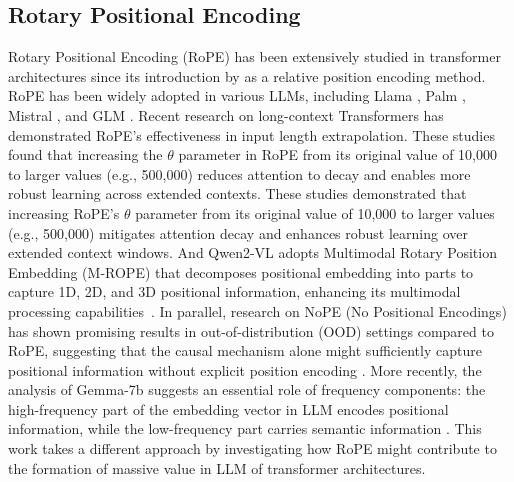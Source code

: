 \subsection{Rotary Positional Encoding}
Rotary Positional Encoding (RoPE) has been extensively studied in transformer architectures since its introduction by \citep{su2021roformer} as a relative position encoding method. RoPE has been widely adopted in various LLMs, including Llama \citep{touvron2023llama}, Palm \citep{anil2023palm}, Mistral \citep{jiang2023mistral}, and GLM \citep{du2022glm}. Recent research on long-context Transformers \citep{sun-etal-2023-length, xiong-etal-2024-effective, dubey2024llama} has demonstrated RoPE's effectiveness in input length extrapolation. These studies found that increasing the $\theta$ parameter in RoPE from its original value of 10,000 to larger values (e.g., 500,000) reduces attention to decay and enables more robust learning across extended contexts. These studies demonstrated that increasing RoPE's $\theta$ parameter from its original value of 10,000 to larger values (e.g., 500,000) mitigates attention decay and enhances robust learning over extended context windows. And Qwen2-VL adopts Multimodal Rotary Position Embedding (M-ROPE) that decomposes positional embedding into parts to capture 1D, 2D, and 3D positional information, enhancing its multimodal processing capabilities~\citep{Qwen2VL}. In parallel, research on NoPE (No Positional Encodings) has shown promising results in out-of-distribution (OOD) settings compared to RoPE, suggesting that the causal mechanism alone might sufficiently capture positional information without explicit position encoding \citep{haviv2022transformer, kazemnejad2024impact}. More recently, the analysis of Gemma-7b suggests an essential role of frequency components: the high-frequency part of the embedding vector in LLM encodes positional information, while the low-frequency part carries semantic information \citep{barbero2024round}. This work takes a different approach by investigating how RoPE might contribute to the formation of massive value in LLM of transformer architectures.